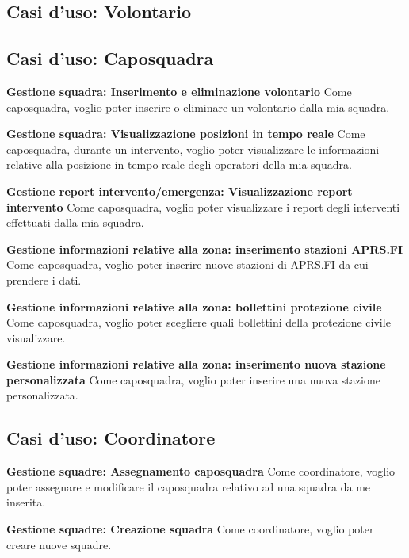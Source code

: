 \subsection{Casi d'uso: Volontario}


\subsection{Casi d'uso: Caposquadra}
\textbf{Gestione squadra: Inserimento e eliminazione volontario}
Come caposquadra, voglio poter inserire o eliminare un volontario dalla mia squadra.

\textbf{Gestione squadra: Visualizzazione posizioni in tempo reale}
Come caposquadra, durante un intervento, voglio poter visualizzare le informazioni relative alla posizione in tempo reale degli operatori della mia squadra.

\textbf{Gestione report intervento/emergenza: Visualizzazione report intervento}
Come caposquadra, voglio poter visualizzare i report degli interventi effettuati dalla mia squadra.

\textbf{Gestione informazioni relative alla zona: inserimento stazioni APRS.FI}
Come caposquadra, voglio poter inserire nuove stazioni di APRS.FI da cui prendere i dati.

\textbf{Gestione informazioni relative alla zona: bollettini protezione civile}
Come caposquadra, voglio poter scegliere quali bollettini della protezione civile visualizzare.

\textbf{Gestione informazioni relative alla zona: inserimento nuova stazione personalizzata}
Come caposquadra, voglio poter inserire una nuova stazione personalizzata.


\subsection{Casi d'uso: Coordinatore}

\textbf{Gestione squadre: Assegnamento caposquadra}
Come coordinatore, voglio poter assegnare e modificare il caposquadra relativo ad una squadra da me inserita.

\textbf{Gestione squadre: Creazione squadra}
Come coordinatore, voglio poter creare nuove squadre.